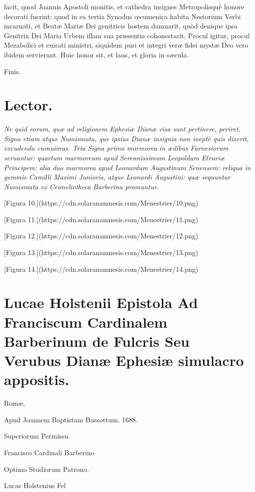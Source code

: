 \documentclass[a4paper, 11pt, oneside, polutonikogreek, latin]{article}
\begin{document}
facit, quod Joannis Apostoli monitis, et cathedra insignes Metropolisquè honore decorati fuerint: quod in ea tertia Synodus œcumenica habita Nestorium Verbi incarnati, et Beatæ Mariæ Dei genitricis hostem damnarit, quòd denique ipsa Genitrix Dei Maria Urbem illam sua præsentia cohonestarit. Procul igitur, procul Mezabolici et euirati ministri, siquidem puri et integri veræ fidei mystæ Deo vero ibidem servierunt. Huic honor sit, et laus, et gloria in sæcula.

Finis.
\clearpage
\section{Lector.}
\paragraph{}
\emph{Ne quid eorum, quæ ad religionem Ephesiæ Dianæ visa sunt pertinere, periret, Signa etiam atque Numismata, que ipsius Dianæ insignia non ineptè quis dixerit, excudenda curauimus. Tria Signa prima marmorea in ædibus Farnesiorum seruantur: quartum marmoreum apud Serennissimum Leopoldum Etruriæ Principem: alia duo marmorea apud Leonardum Augustinum Senensem: reliqua in gemmis Camilli Maximi Junioris, atque Leonardi Augustini: quæ sequuntur Numismata ex Ceimeliotheca Barberina promuntur.}

[Figura 10.](https://cdn.solaranamnesis.com/Menestrier/10.png)

[Figura 11.](https://cdn.solaranamnesis.com/Menestrier/11.png)

[Figura 12.](https://cdn.solaranamnesis.com/Menestrier/12.png)

[Figura 13.](https://cdn.solaranamnesis.com/Menestrier/13.png)

[Figura 14.](https://cdn.solaranamnesis.com/Menestrier/14.png)
\clearpage
\section{Lucae Holstenii Epistola Ad Franciscum Cardinalem Barberinum de Fulcris Seu Verubus Dianæ Ephesiæ simulacro appositis.}

Romæ,

Apud Joannem Baptistam Bussottum. 1688.

Superiorum Permissu.

Francisco Cardinali Barberino

Optimo Studiorum Patrono.

Lucas Holstenius Fel
\end{document}
